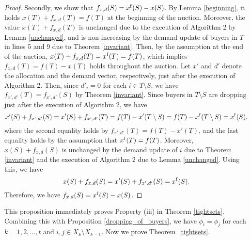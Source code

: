 \documentclass[letterpaper,11pt]{article}
\begin{document}
\begin{proof}
	Secondly, we show that $f_{x,d}(S)=x^{\rm f}(S)-x(S)$.
	By Lemma \ref{beginning}, it holds $x(T)+f_{x,d}(T)=f(T)$
	at the beginning of the auction.
	Moreover, the value $x(T)+f_{x,d}(T)$
	is unchanged due to the execution of Algorithm 2 by Lemma \ref{unchanged}, 
	and is non-increasing by the demand update of buyers in $T$ in lines 5 and 9 due to Theorem \ref{invariant}.
	Then, by the assumption at the end of the auction, $x(T)+f_{x,d}(T)=x^{\rm f}(T)=f(T)$, 
	which implies $f_{x,d}(T)=f(T)-x(T)$ holds throughout the auction.
	Let $x'$ and $d'$ denote the allocation and the demand vector, 
	respectively, just after the execution of Algorithm 2.
	Then, since $d'_i=0$ for each $i\in T\setminus S$, 
	we have $f_{x',d'}(T)=f_{x',d'}(S)$ by Theorem \ref{invariant}.
	Since buyers in $T\setminus S$ are dropping just after the execution of Algorithm 2, we have
	\[
	x'(S)+f_{x',d'}(S)=x'(S)+f_{x',d'}(T)=f(T)-x'(T\setminus S)=f(T)-x^{\rm f}(T\setminus S)=x^{\rm f}(S), 
	\]
	where the second equality holds by $f_{x',d'}(T)=f(T)-x'(T)$,
	and the last equality holds by the assumption that $x^{\rm f} (T)=f(T)$.
	Moreover, $x(S)+f_{x,d}(S)$ is unchanged 
	by the demand update of $i$ due to Theorem \ref{invariant} 
	and the execution of Algorithm 2 due to Lemma \ref{unchanged}.
	Using this, we have 
	\[
	x(S)+f_{x,d}(S)=x'(S)+f_{x',d'}(S)=x^{\rm f}(S).
	\]
	Therefore, we have $f_{x,d}(S)=x^{\rm f}(S)-x(S)$.
	\end{proof}

	
	
	
	
	This proposition immediately proves Property (iii) in Theorem \ref{tightsets}.
	Combining this with Proposition \ref{dropping_of_buyers}, we have 
	$\phi_i=\phi_j$ for each $k=1,2,\ldots,t$ and $i, j\in X_{k}\setminus X_{k-1}$.
	Now we prove Theorem~\ref{tightsets}. 
	
\end{document}
